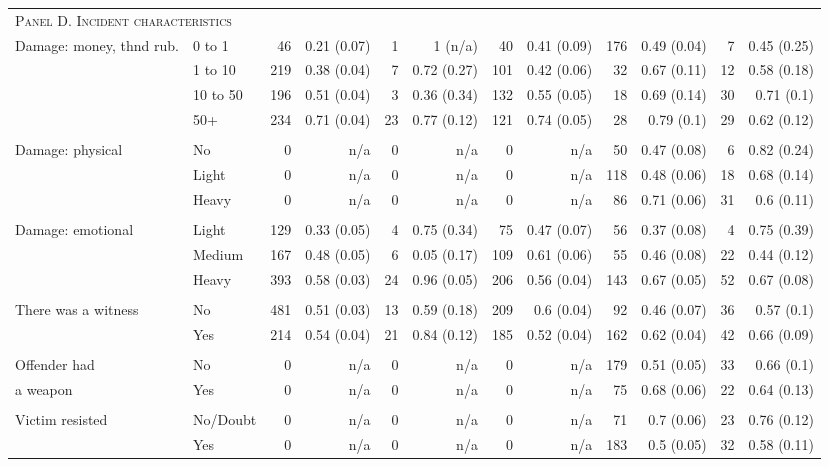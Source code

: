 \begin{tabular}{p{1.3in}p{1.1in}rrrrrrrrrr}
	\midrule
	\multicolumn{12}{l}{\textsc{Panel D. Incident characteristics}} \\
	Damage: money, thnd rub. & 0 to 1 & 46 & 0.21 (0.07) & 1 & 1 (n/a) & 40 & 0.41 (0.09) & 176 & 0.49 (0.04) & 7 & 0.45 (0.25) \\ 
	& 1 to 10 & 219 & 0.38 (0.04) & 7 & 0.72 (0.27) & 101 & 0.42 (0.06) & 32 & 0.67 (0.11) & 12 & 0.58 (0.18) \\ 
	& 10 to 50 & 196 & 0.51 (0.04) & 3 & 0.36 (0.34) & 132 & 0.55 (0.05) & 18 & 0.69 (0.14) & 30 & 0.71 (0.1) \\ 
	& 50+ & 234 & 0.71 (0.04) & 23 & 0.77 (0.12) & 121 & 0.74 (0.05) & 28 & 0.79 (0.1) & 29 & 0.62 (0.12) \\ 
		\vspace{1pt}\\
	Damage: physical & No & 0 & n/a & 0 & n/a & 0 & n/a & 50 & 0.47 (0.08) & 6 & 0.82 (0.24) \\ 
	& Light & 0 & n/a & 0 & n/a & 0 & n/a & 118 & 0.48 (0.06) & 18 & 0.68 (0.14) \\ 
	& Heavy & 0 & n/a & 0 & n/a & 0 & n/a & 86 & 0.71 (0.06) & 31 & 0.6 (0.11) \\ 
		\vspace{1pt}\\
	Damage: emotional & Light & 129 & 0.33 (0.05) & 4 & 0.75 (0.34) & 75 & 0.47 (0.07) & 56 & 0.37 (0.08) & 4 & 0.75 (0.39) \\ 
	& Medium & 167 & 0.48 (0.05) & 6 & 0.05 (0.17) & 109 & 0.61 (0.06) & 55 & 0.46 (0.08) & 22 & 0.44 (0.12) \\ 
	& Heavy & 393 & 0.58 (0.03) & 24 & 0.96 (0.05) & 206 & 0.56 (0.04) & 143 & 0.67 (0.05) & 52 & 0.67 (0.08) \\ 
		\vspace{1pt}\\
	There was a witness & No & 481 & 0.51 (0.03) & 13 & 0.59 (0.18) & 209 & 0.6 (0.04) & 92 & 0.46 (0.07) & 36 & 0.57 (0.1) \\ 
	& Yes & 214 & 0.54 (0.04) & 21 & 0.84 (0.12) & 185 & 0.52 (0.04) & 162 & 0.62 (0.04) & 42 & 0.66 (0.09) \\ 
		\vspace{1pt}\\
	Offender had & No & 0 & n/a & 0 & n/a & 0 & n/a & 179 & 0.51 (0.05) & 33 & 0.66 (0.1) \\ 
	a weapon & Yes & 0 & n/a & 0 & n/a & 0 & n/a & 75 & 0.68 (0.06) & 22 & 0.64 (0.13) \\ 
		\vspace{1pt}\\
	Victim resisted & No/Doubt & 0 & n/a & 0 & n/a & 0 & n/a & 71 & 0.7 (0.06) & 23 & 0.76 (0.12) \\ 
	& Yes & 0 & n/a & 0 & n/a & 0 & n/a & 183 & 0.5 (0.05) & 32 & 0.58 (0.11) \\
	

\end{tabular}

